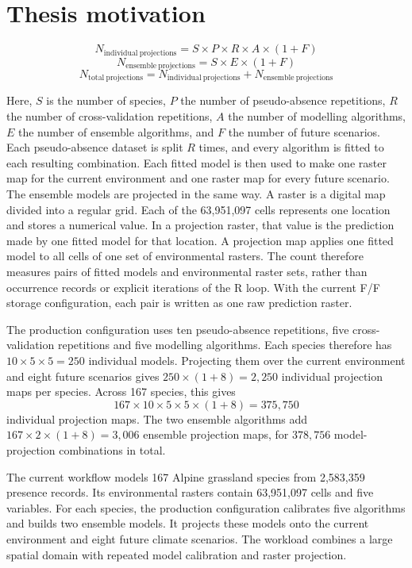 \section{Thesis motivation}

\[
N_{\mathrm{individual\ projections}} = S \times P \times R \times A \times (1 + F)
\]
\[
N_{\mathrm{ensemble\ projections}} = S \times E \times (1 + F)
\]
\[
N_{\mathrm{total\ projections}} = N_{\mathrm{individual\ projections}} + N_{\mathrm{ensemble\ projections}}
\]

Here, $S$ is the number of species, $P$ the number of pseudo-absence repetitions, $R$ the number of cross-validation repetitions, $A$ the number of modelling algorithms, $E$ the number of ensemble algorithms, and $F$ the number of future scenarios. Each pseudo-absence dataset is split $R$ times, and every algorithm is fitted to each resulting combination. Each fitted model is then used to make one raster map for the current environment and one raster map for every future scenario. The ensemble models are projected in the same way. A raster is a digital map divided into a regular grid. Each of the 63,951,097 cells represents one location and stores a numerical value. In a projection raster, that value is the prediction made by one fitted model for that location. A projection map applies one fitted model to all cells of one set of environmental rasters. The count therefore measures pairs of fitted models and environmental raster sets, rather than occurrence records or explicit iterations of the R loop. With the current F/F storage configuration, each pair is written as one raw prediction raster.

The production configuration uses ten pseudo-absence repetitions, five cross-validation repetitions and five modelling algorithms. Each species therefore has $10 \times 5 \times 5 = 250$ individual models. Projecting them over the current environment and eight future scenarios gives $250 \times (1 + 8) = 2{,}250$ individual projection maps per species. Across 167 species, this gives
\[
167 \times 10 \times 5 \times 5 \times (1 + 8) = 375{,}750
\]
individual projection maps. The two ensemble algorithms add $167 \times 2 \times (1 + 8) = 3{,}006$ ensemble projection maps, for $378{,}756$ model-projection combinations in total.

The current workflow models 167 Alpine grassland species from 2,583,359 presence records. Its environmental rasters contain 63,951,097 cells and five variables. For each species, the production configuration calibrates five algorithms and builds two ensemble models. It projects these models onto the current environment and eight future climate scenarios. The workload combines a large spatial domain with repeated model calibration and raster projection.

